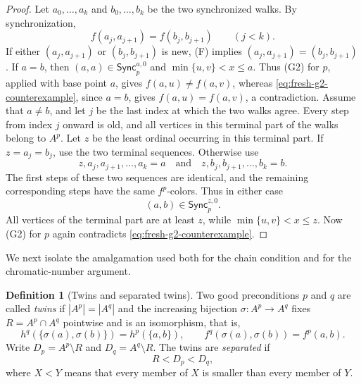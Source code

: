 \documentclass[10pt,a4paper]{amsart}
\numberwithin{equation}{section}
\theoremstyle{definition}
\newtheorem{definition}[theorem]{Definition}
\theoremstyle{remark}
\begin{document}
\begin{proof}
Let $a_0,\ldots,a_k$ and $b_0,\ldots,b_k$ be the two synchronized
walks.  By synchronization,
\begin{displaymath}
 f(a_j,a_{j+1})=f(b_j,b_{j+1})\qquad(j<k).
\end{displaymath}
If either $(a_j,a_{j+1})$ or $(b_j,b_{j+1})$ is new, (F) implies
$(a_j,a_{j+1})=(b_j,b_{j+1})$.  If $a=b$, then
$(a,a)\in\mathsf{Sync}^{a,0}_p$ and
$\min\{u,v\}<x\leq a$.  Thus (G2) for $p$, applied with base point
$a$, gives $f(a,u)\ne f(a,v)$, whereas
\eqref{eq:fresh-g2-counterexample}, since $a=b$, gives
$f(a,u)=f(a,v)$, a contradiction.
Assume that $a\ne b$, and let $j$ be the last index at which the two
walks agree.  Every step from index $j$ onward is old, and all vertices
in this terminal part of the walks belong to $A^p$.  Let $z$ be the
least ordinal occurring in this terminal part.  If $z=a_j=b_j$, use
the two terminal sequences.  Otherwise use
\begin{displaymath}
 z,a_j,a_{j+1},\ldots,a_k=a
 \quad\text{and}\quad
 z,b_j,b_{j+1},\ldots,b_k=b.
\end{displaymath}
The first steps of these two sequences are identical, and the remaining
corresponding steps have the same $f^p$-colors.  Thus in either case
\begin{displaymath}
 (a,b)\in\mathsf{Sync}^{z,0}_p.
\end{displaymath}
All vertices of the terminal part are at least $z$, while
$\min\{u,v\}<x\leq z$.  Now (G2) for $p$ again contradicts
\eqref{eq:fresh-g2-counterexample}.
\end{proof}

We next isolate the amalgamation used both for the chain condition and
for the chromatic-number argument.

\begin{definition}[Twins and separated twins]\label{def:twins}
Two good preconditions $p$ and $q$
are called \emph{twins} if $|A^p|=|A^q|$ and the increasing bijection
$\sigma:A^p\to A^q$ fixes $R=A^p\cap A^q$ pointwise and is an
isomorphism, that is,
\begin{displaymath}
 h^q(\{\sigma(a),\sigma(b)\})=h^p(\{a,b\}),
 \qquad
 f^q(\sigma(a),\sigma(b))=f^p(a,b).
\end{displaymath}
Write $D_p=A^p\setminus R$ and $D_q=A^q\setminus R$.
The twins are \emph{separated} if
\begin{displaymath}
 R<D_p<D_q,
\end{displaymath}
where $X<Y$ means that every member of $X$ is smaller than every
member of $Y$.
\end{definition}
\end{document}
